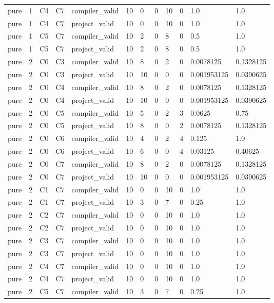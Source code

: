 \begin{tabular}{llllllllllll}
pure & 1 & C4 & C7 & compiler\_valid & 10 & 0 & 0 & 10 & 0 & 1.0 & 1.0 \\
pure & 1 & C4 & C7 & project\_valid & 10 & 0 & 0 & 10 & 0 & 1.0 & 1.0 \\
pure & 1 & C5 & C7 & compiler\_valid & 10 & 2 & 0 & 8 & 0 & 0.5 & 1.0 \\
pure & 1 & C5 & C7 & project\_valid & 10 & 2 & 0 & 8 & 0 & 0.5 & 1.0 \\
pure & 2 & C0 & C3 & compiler\_valid & 10 & 8 & 0 & 2 & 0 & 0.0078125 & 0.1328125 \\
pure & 2 & C0 & C3 & project\_valid & 10 & 10 & 0 & 0 & 0 & 0.001953125 & 0.0390625 \\
pure & 2 & C0 & C4 & compiler\_valid & 10 & 8 & 0 & 2 & 0 & 0.0078125 & 0.1328125 \\
pure & 2 & C0 & C4 & project\_valid & 10 & 10 & 0 & 0 & 0 & 0.001953125 & 0.0390625 \\
pure & 2 & C0 & C5 & compiler\_valid & 10 & 5 & 0 & 2 & 3 & 0.0625 & 0.75 \\
pure & 2 & C0 & C5 & project\_valid & 10 & 8 & 0 & 0 & 2 & 0.0078125 & 0.1328125 \\
pure & 2 & C0 & C6 & compiler\_valid & 10 & 4 & 0 & 2 & 4 & 0.125 & 1.0 \\
pure & 2 & C0 & C6 & project\_valid & 10 & 6 & 0 & 0 & 4 & 0.03125 & 0.40625 \\
pure & 2 & C0 & C7 & compiler\_valid & 10 & 8 & 0 & 2 & 0 & 0.0078125 & 0.1328125 \\
pure & 2 & C0 & C7 & project\_valid & 10 & 10 & 0 & 0 & 0 & 0.001953125 & 0.0390625 \\
pure & 2 & C1 & C7 & compiler\_valid & 10 & 0 & 0 & 10 & 0 & 1.0 & 1.0 \\
pure & 2 & C1 & C7 & project\_valid & 10 & 3 & 0 & 7 & 0 & 0.25 & 1.0 \\
pure & 2 & C2 & C7 & compiler\_valid & 10 & 0 & 0 & 10 & 0 & 1.0 & 1.0 \\
pure & 2 & C2 & C7 & project\_valid & 10 & 0 & 0 & 10 & 0 & 1.0 & 1.0 \\
pure & 2 & C3 & C7 & compiler\_valid & 10 & 0 & 0 & 10 & 0 & 1.0 & 1.0 \\
pure & 2 & C3 & C7 & project\_valid & 10 & 0 & 0 & 10 & 0 & 1.0 & 1.0 \\
pure & 2 & C4 & C7 & compiler\_valid & 10 & 0 & 0 & 10 & 0 & 1.0 & 1.0 \\
pure & 2 & C4 & C7 & project\_valid & 10 & 0 & 0 & 10 & 0 & 1.0 & 1.0 \\
pure & 2 & C5 & C7 & compiler\_valid & 10 & 3 & 0 & 7 & 0 & 0.25 & 1.0 \\

\end{tabular}
